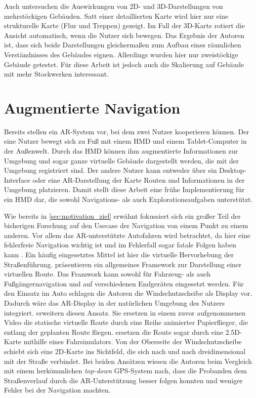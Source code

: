 Auch \textcite{Li2013} untersuchen die Auswirkungen von 2D- und 3D-Darstellungen von mehrstöckigen Gebäuden.
Satt einer detaillierten Karte wird hier nur eine strukturelle Karte (Flur und Treppen) gezeigt.
Im Fall der 3D-Karte rotiert die Ansicht automatisch, wenn die Nutzer sich bewegen.
Das Ergebnis der Autoren ist, dass sich beide Darstellungen gleichermaßen zum Aufbau eines räumlichen Verständnisses des Gebäudes eignen.
Allerdings wurden hier nur zweistöckige Gebäude getestet.
Für diese Arbeit ist jedoch auch die Skalierung auf Gebäude mit mehr Stockwerken interessant.

\section{Augmentierte Navigation}
Bereits \textcite{Hoellerer1999} stellen ein AR-System vor, bei dem zwei Nutzer kooperieren können.
Der eine Nutzer bewegt sich zu Fuß mit einem HMD und einem Tablet-Computer in der Außenwelt.
Durch das HMD können ihm augmentierte Informationen zur Umgebung und sogar ganze virtuelle Gebäude dargestellt werden, die mit der Umgebung registriert sind.
Der andere Nutzer kann entweder über ein Desktop-Interface oder eine AR-Darstellung der Karte Routen und Informationen in der Umgebung platzieren.
Damit stellt diese Arbeit eine frühe Implementierung für ein HMD dar, die sowohl Navigations- als auch Explorationsaufgaben unterstützt.

Wie bereits in \autoref{sec:motivation_ziel} erwähnt fokussiert sich ein großer Teil der bisherigen Forschung auf den Usecase der Navigation von einem Punkt zu einem anderen.
Vor allem das AR-unterstützte Autofahren wird betrachtet, da hier eine fehlerfreie Navigation wichtig ist und im Fehlerfall sogar fatale Folgen haben kann \parencite{Lin2017}.
Ein häufig eingesetztes Mittel ist hier die virtuelle Hervorhebung der Straßenführung.
\textcite{Narzt2006} präsentieren ein allgemeines Framework zur Darstellung einer virtuellen Route.
Das Framwork kann sowohl für Fahrzeug- als auch Fußgängernavigation und auf verschiedenen Endgeräten eingesetzt werden.
Für den Einsatz im Auto schlagen die Autoren die Windschutzscheibe als Display vor.
Dadurch wäre das AR-Display in der natürlichen Umgebung des Nutzers integriert.
\textcite{Bark2014} erweitern diesen Ansatz.
Sie ersetzen in einem zuvor aufgenommenen Video die statische virtuelle Route durch eine Reihe animierter Papierflieger, die entlang der geplanten Route fliegen.
\textcite{Kim2009} ersetzen die Route sogar durch eine 2.5D-Karte mithilfe eines Fahrsimulators.
Von der Oberseite der Windschutzscheibe schiebt sich eine 2D-Karte ins Sichtfeld, die sich nach und nach dreidimensional mit der Straße verbindet.
Bei beiden Ansätzen wiesen die Autoren beim Vergleich mit einem herkömmlichen \emph{top-down} GPS-System nach, dass die Probanden dem Straßenverlauf durch die AR-Unterstützung besser folgen konnten und weniger Fehler bei der Navigation machten.

